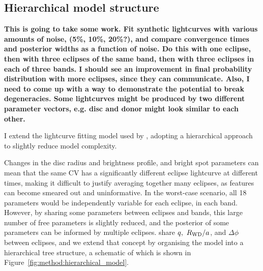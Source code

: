 \subsection{Hierarchical model structure}
{\bf This is going to take some work. Fit synthetic lightcurves with various amounts of noise, (5\%, 10\%, 20\%?), and compare convergence times and posterior widths as a function of noise. Do this with one eclipse, then with three eclipses of the same band, then with three eclipses in each of three bands.
I should see an improvement in final probability distribution with more eclipses, since they can communicate.
Also, I need to come up with a way to demonstrate the potential to break degeneracies. Some lightcurves might be produced by two different parameter vectors, e.g. disc and donor might look similar to each other. }

I extend the lightcurve fitting model used by \citet{McAllister2019}, adopting a hierarchical approach to slightly reduce model complexity. 

Changes in the disc radius and brightness profile, and bright spot parameters can mean that the same CV has a significantly different eclipse lightcurve at different times, making it difficult to justify averaging together many eclipses, as features can become smeared out and uninformative. In the worst-case scenario, all 18 parameters would be independently variable for each eclipse, in each band. However, by sharing some parameters between eclipses and bands, this large number of free parameters is slightly reduced, and the posterior of some parameters can be informed by multiple eclipses. \citet{McAllister2017} share $q,\ R_{\rm WD}/a$, and $\Delta\phi$ between eclipses, and we extend that concept by organising the model into a hierarchical tree structure, a schematic of which is shown in Figure~\ref{fig:method:hierarchical_model}. 

